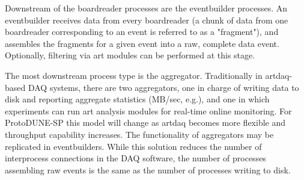 Downstream of the boardreader processes are the eventbuilder
processes. An eventbuilder receives data from every boardreader (a
chunk of data from one boardreader corresponding to an event is
referred to as a "fragment"), and assembles the fragments for a given
event into a raw, complete data event. Optionally, filtering via art
modules can be performed at this stage.

The most downstream process type is the aggregator. Traditionally in
artdaq-based DAQ systems, there are two aggregators, one in charge of
writing data to disk and reporting aggregate statistics (MB/sec,
e.g.), and one in which experiments can run art analysis modules for
real-time online monitoring. 
%
%
For ProtoDUNE-SP this model will change as
artdaq becomes more flexible and throughput
capability increases. The functionality
of aggregators may be replicated in eventbuilders. While this solution  reduces
the number of interprocess connections in the DAQ software, the number of
processes assembling raw events is the same as the number of processes
writing to disk.


 
